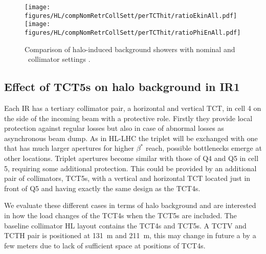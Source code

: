 
\begin{figure}
\begin{center}
\texttt{[image: figures/HL/compNomRetrCollSett/perTCThit/ratioEkinAll.pdf]}
\texttt{[image: figures/HL/compNomRetrCollSett/perTCThit/ratioPhiEnAll.pdf]}
\end{center}
\vspace{-0.6cm}
 \caption{Comparison of halo-induced background showers with nominal and \twosigmaret~collimator settings .
  \label{fig:compNomRetrSett}}
\end{figure}



\subsection{Effect of TCT5s on halo background in IR1}

Each IR has a tertiary collimator pair, a horizontal and vertical TCT, in cell 4 on the side of the incoming beam with a protective role. Firstly they provide local protection against regular losses but also in case of abnormal losses as asynchronous beam dump. As in HL-LHC the triplet will be exchanged with one that has much larger apertures for higher $\beta^*$ reach, possible bottlenecks emerge at other locations. Triplet apertures become similar with those of Q4 and Q5 in cell 5, requiring some additional protection. This could be provided by an additional pair of collimators, TCT5s, with a vertical and horizontal TCT located just in front of Q5 and having exactly the same design as the TCT4s.

We evaluate these different cases in terms of halo background and are interested in how the load changes of the TCT4s when the TCT5s are included. The baseline collimator HL layout contains the TCT4s and TCT5s. A TCTV and TCTH pair is positioned at 131~m and 211~m, this may change in future a by a few meters due to lack of sufficient space at positions of TCT4s.

